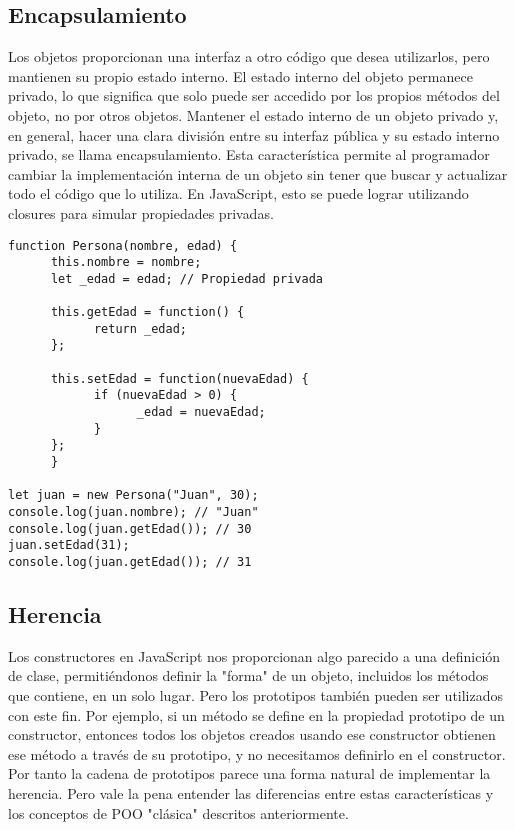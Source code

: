 \documentclass{article}
\begin{document}
\subsection{Encapsulamiento}

Los objetos proporcionan una interfaz a otro código que desea utilizarlos, 
pero mantienen su propio estado interno. El estado interno del objeto permanece 
privado, lo que significa que solo puede ser accedido por los propios métodos 
del objeto, no por otros objetos. Mantener el estado interno de un objeto 
privado y, en general, hacer una clara división entre su interfaz pública y 
su estado interno privado, se llama encapsulamiento. Esta característica 
permite al programador cambiar la implementación interna de un objeto sin 
tener que buscar y actualizar todo el código que lo utiliza. En JavaScript, 
esto se puede lograr utilizando closures para simular propiedades privadas.

\begin{lstlisting}
function Persona(nombre, edad) {
      this.nombre = nombre;
      let _edad = edad; // Propiedad privada
      
      this.getEdad = function() {
            return _edad;
      };
      
      this.setEdad = function(nuevaEdad) {
            if (nuevaEdad > 0) {
                  _edad = nuevaEdad;
            }
      };
      }
      
let juan = new Persona("Juan", 30);
console.log(juan.nombre); // "Juan"
console.log(juan.getEdad()); // 30
juan.setEdad(31);
console.log(juan.getEdad()); // 31
\end{lstlisting}

\subsection{Herencia}

Los constructores en JavaScript nos proporcionan algo parecido a una 
definición de clase, permitiéndonos definir la "forma" de un objeto, 
incluidos los métodos que contiene, en un solo lugar. Pero los prototipos 
también pueden ser utilizados con este fin. Por ejemplo, si un método se define en 
la propiedad prototipo de un constructor, entonces todos los objetos creados 
usando ese constructor obtienen ese método a través de su prototipo, y no 
necesitamos definirlo en el constructor. Por tanto la cadena de prototipos 
parece una forma natural de implementar la herencia. Pero vale la pena 
entender las diferencias entre estas características y los conceptos de 
POO "clásica" descritos anteriormente.
\end{document}
